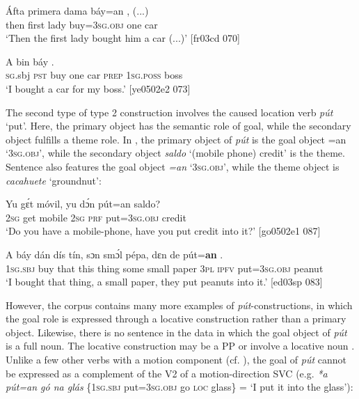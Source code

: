 \ea%
    \label{ex:key:1213}
    \gll \'{A}fta    primera  dama  báy=an        , (...)\\
then  first    lady    buy=\textsc{3sg.obj}  one    car\\

\glt ‘Then the first lady bought him a car (...)’ [fr03cd 070]
\z


\ea%
    \label{ex:key:1214}
    \gll \MakeUppercase{A}   bin  báy              .\\
\textsc{sg}.sbj  \textsc{pst}  buy  one    car    \textsc{prep}  \textsc{1sg.poss}  boss\\

\glt ‘I bought a car for my boss.’ [ye0502e2 073]
\z

The second type of type 2 construction involves the caused location verb \textit{pút} ‘put’. Here, the primary object has the semantic role of goal, while the secondary object fulfills a theme role. In , the primary object of \textit{pút} is the goal object =an ‘\textsc{3sg.obj}’, while the secondary object \textit{saldo} ‘(mobile phone) credit’ is the theme. Sentence  also features the goal object\textit{ =an} ‘\textsc{3sg.obj}’, while the theme object is \textit{cacahuete} ‘groundnut’:


\ea%
    \label{ex:key:1215}
    \gll Yu  gɛ́t  móvil,  yu  dɔ́n    pút=an    saldo?\\
\textsc{2sg}  get  mobile  \textsc{2sg}  \textsc{prf}    put=\textsc{3sg.obj}  credit\\

\glt ‘Do you have a mobile-phone, have you put credit into it?’ [go0502e1 087]
\z


\ea%
    \label{ex:key:1216}
    \gll A    báy  dán  dís  tín,    sɔn    smɔ́l  pépa,
dɛn  de  pút=\textbf{an}    .\\
\textsc{1sg.sbj}  buy  that  this  thing  some  small  paper
\textsc{3pl}  \textsc{ipfv}  put=\textsc{3sg.obj}  peanut\\

\glt ‘I bought that thing, a small paper, they put peanuts into it.’ [ed03sp 083]
\z

However, the corpus contains many more examples of \textit{pút}{}-constructions, in which the goal role is expressed through a locative construction rather than a primary object. Likewise, there is no sentence in the data in which the goal object of \textit{pút} is a full noun. The locative construction may be a PP  or involve a locative noun . Unlike a few other verbs with a motion component (cf. ), the goal of \textit{pút} cannot be expressed as a complement of the V2 of a motion-direction SVC (e.g. \textit{*a pút=an gó na glás} \{1\textsc{sg.sbj} put=3\textsc{sg.obj} go \textsc{loc} glass\} = ‘I put it into the glass’):


